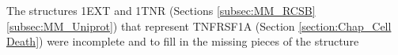 The structures 1EXT \cite{} and 1TNR \cite{} (Sections \ref{subsec:MM_RCSB} \ref{subsec:MM_Uniprot}) that represent TNFRSF1A (Section \ref{section:Chap_Cell Death}) were incomplete and to fill in the missing pieces of the structure